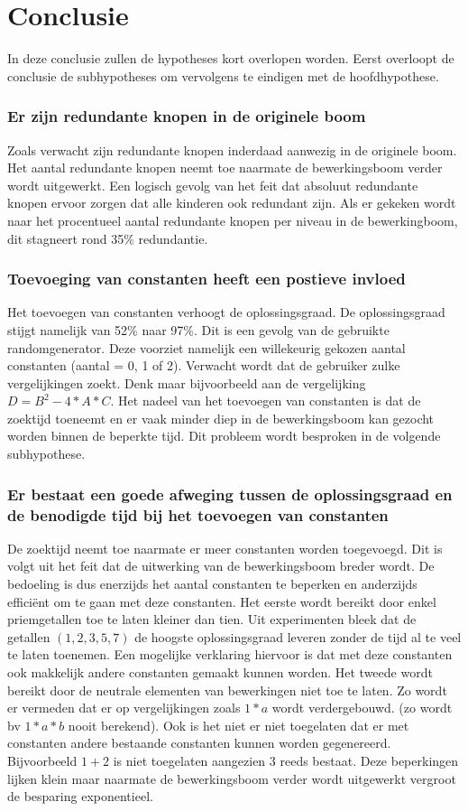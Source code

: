 \documentclass[Main.tex]{subfiles}
\begin{document}
\section{Conclusie}
In deze conclusie zullen de hypotheses kort overlopen worden. Eerst overloopt de conclusie de subhypotheses om vervolgens te eindigen met de hoofdhypothese.

\subsubsection{Er zijn redundante knopen in de originele boom}
Zoals verwacht zijn redundante knopen inderdaad aanwezig in de originele boom. Het aantal redundante knopen neemt toe naarmate de bewerkingsboom verder wordt uitgewerkt. Een logisch gevolg van het feit dat absoluut redundante knopen ervoor zorgen dat alle kinderen ook redundant zijn. Als er gekeken wordt naar het procentueel aantal redundante knopen per niveau in de bewerkingboom, dit stagneert rond 35\% redundantie.

\subsubsection{Toevoeging van constanten heeft een postieve invloed}
Het toevoegen van constanten verhoogt de oplossingsgraad. De oplossingsgraad stijgt namelijk van 52\% naar 97\%. Dit is een gevolg van de gebruikte randomgenerator. Deze voorziet namelijk een willekeurig gekozen aantal constanten (aantal = 0, 1 of 2). Verwacht wordt dat de gebruiker zulke vergelijkingen zoekt. Denk maar bijvoorbeeld aan de vergelijking $D = B^{2} - 4 \ast A \ast C$. Het nadeel van het toevoegen van constanten is dat de zoektijd toeneemt en er vaak minder diep in de bewerkingsboom kan gezocht worden binnen de beperkte tijd. Dit probleem wordt besproken in de volgende subhypothese.

\subsubsection{Er bestaat een goede afweging tussen de oplossingsgraad en de benodigde tijd bij het toevoegen van constanten}
De zoektijd neemt toe naarmate er meer constanten worden toegevoegd. Dit is volgt uit het feit dat de uitwerking van de bewerkingsboom breder wordt. De bedoeling is dus enerzijds het aantal constanten te beperken en anderzijds effici\"ent om te gaan met deze constanten. Het eerste wordt bereikt door enkel priemgetallen toe te laten kleiner dan tien. Uit experimenten bleek dat de getallen $(1, 2, 3, 5, 7)$ de hoogste oplossingsgraad leveren zonder de tijd al te veel te laten toenemen. Een mogelijke verklaring hiervoor is dat met deze constanten ook makkelijk andere constanten gemaakt kunnen worden. Het tweede wordt bereikt door de neutrale elementen van bewerkingen niet toe te laten. Zo wordt er vermeden dat er op vergelijkingen zoals $1*a$ wordt verdergebouwd. (zo wordt bv $1*a*b$ nooit berekend). Ook is het niet er niet toegelaten dat er met constanten andere bestaande constanten kunnen worden gegenereerd. Bijvoorbeeld $1+2$ is niet toegelaten aangezien $3$ reeds bestaat. Deze beperkingen lijken klein maar naarmate de bewerkingsboom verder wordt uitgewerkt vergroot de besparing exponentieel.
\end{document}
